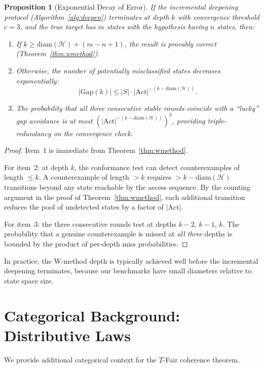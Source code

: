 \documentclass[11pt]{article}
\newtheorem{proposition}[theorem]{Proposition}
\newcommand{\Act}{\ensuremath{\mathrm{Act}}}
\newcommand{\TFair}{$T$-Fair}
\newcommand{\diam}{\ensuremath{\mathrm{diam}}}
\begin{document}
\begin{proposition}[Exponential Decay of Error]
\label{prop:exp-decay}
If the incremental deepening protocol (Algorithm~\ref{alg:deepen})
terminates at depth $k$ with convergence threshold $c = 3$, and the true
target has $m$ states with the hypothesis having $n$ states, then:
\begin{enumerate}[nosep]
\item If $k \geq \diam(\mathcal{H}) + (m - n + 1)$, the result is
  provably correct (Theorem~\ref{thm:wmethod}).
\item Otherwise, the number of potentially misclassified states
  decreases exponentially:
  \[
    |\mathrm{Gap}(k)| \leq |S| \cdot |\Act|^{-(k - \diam(\mathcal{H}))}.
  \]
\item The probability that all three consecutive stable rounds coincide
  with a ``lucky'' gap avoidance is at most
  $(|\Act|^{-(k - \diam(\mathcal{H}))})^3$, providing triple-redundancy
  on the convergence check.
\end{enumerate}
\end{proposition}

\begin{proof}
Item~1 is immediate from Theorem~\ref{thm:wmethod}.

For item~2: at depth $k$, the conformance test can detect counterexamples
of length $\leq k$.
A counterexample of length $> k$ requires $> k - \diam(\mathcal{H})$
transitions beyond any state reachable by the access sequence.
By the counting argument in the proof of Theorem~\ref{thm:wmethod},
each additional transition reduces the pool of undetected states by a
factor of $|\Act|$.

For item~3: the three consecutive rounds test at depths $k-2$, $k-1$,
$k$.
The probability that a genuine counterexample is missed at \emph{all
three} depths is bounded by the product of per-depth miss probabilities.
\end{proof}

In practice, the W-method depth is typically achieved well before the
incremental deepening terminates, because our benchmarks have small
diameters relative to state space size.


\section{Categorical Background: Distributive Laws}
\label{app:distributive}

We provide additional categorical context for the \TFair{} coherence
theorem.
\end{document}
